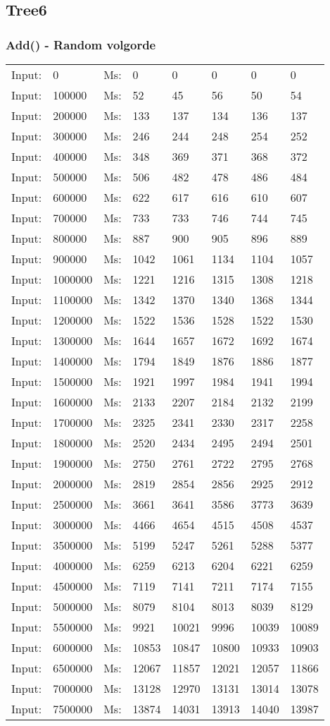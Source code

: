 \documentclass[11pt,a4paper]{report}
\begin{document}
\begin{tiny}
\subsection*{Tree6}
\subsubsection*{Add() - Random volgorde}
\begin{tabular}{l l ||l  l  l  l  l  l}
Input:&0&Ms:&0&0&0&0&0\\
Input:&100000&Ms:&52&45&56&50&54\\
Input:&200000&Ms:&133&137&134&136&137\\
Input:&300000&Ms:&246&244&248&254&252\\
Input:&400000&Ms:&348&369&371&368&372\\
Input:&500000&Ms:&506&482&478&486&484\\
Input:&600000&Ms:&622&617&616&610&607\\
Input:&700000&Ms:&733&733&746&744&745\\
Input:&800000&Ms:&887&900&905&896&889\\
Input:&900000&Ms:&1042&1061&1134&1104&1057\\
Input:&1000000&Ms:&1221&1216&1315&1308&1218\\
Input:&1100000&Ms:&1342&1370&1340&1368&1344\\
Input:&1200000&Ms:&1522&1536&1528&1522&1530\\
Input:&1300000&Ms:&1644&1657&1672&1692&1674\\
Input:&1400000&Ms:&1794&1849&1876&1886&1877\\
Input:&1500000&Ms:&1921&1997&1984&1941&1994\\
Input:&1600000&Ms:&2133&2207&2184&2132&2199\\
Input:&1700000&Ms:&2325&2341&2330&2317&2258\\
Input:&1800000&Ms:&2520&2434&2495&2494&2501\\
Input:&1900000&Ms:&2750&2761&2722&2795&2768\\
Input:&2000000&Ms:&2819&2854&2856&2925&2912\\
Input:&2500000&Ms:&3661&3641&3586&3773&3639\\
Input:&3000000&Ms:&4466&4654&4515&4508&4537\\
Input:&3500000&Ms:&5199&5247&5261&5288&5377\\
Input:&4000000&Ms:&6259&6213&6204&6221&6259\\
Input:&4500000&Ms:&7119&7141&7211&7174&7155\\
Input:&5000000&Ms:&8079&8104&8013&8039&8129\\
Input:&5500000&Ms:&9921&10021&9996&10039&10089\\
Input:&6000000&Ms:&10853&10847&10800&10933&10903\\
Input:&6500000&Ms:&12067&11857&12021&12057&11866\\
Input:&7000000&Ms:&13128&12970&13131&13014&13078\\
Input:&7500000&Ms:&13874&14031&13913&14040&13987\\
\end{tabular}
\\

\end{tiny}
\end{document}
